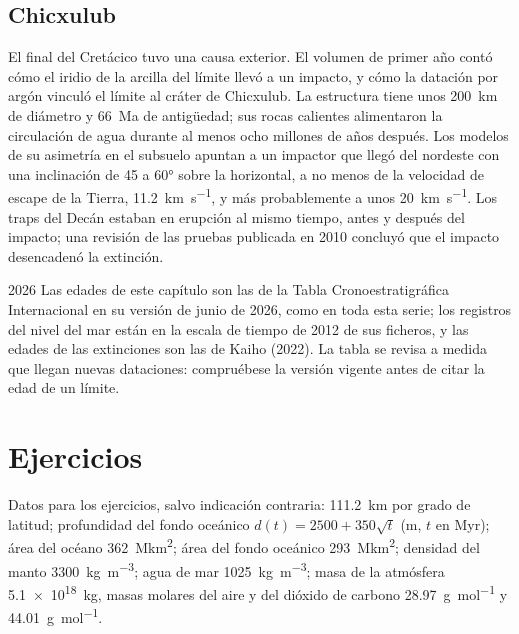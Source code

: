 \subsection*{Chicxulub}

El final del Cretácico tuvo una causa exterior. El volumen de primer año contó cómo el iridio de la
arcilla del límite llevó a un impacto, y cómo la datación por argón vinculó el límite al cráter de Chicxulub.
La estructura tiene unos \qty{200}{km} de diámetro y \qty{66}{Ma} de antigüedad; sus
rocas calientes alimentaron la circulación de agua durante al menos ocho millones de años después. Los modelos de su asimetría
en el subsuelo apuntan a un impactor que llegó del nordeste con una inclinación de 45 a \ang{60} sobre la horizontal,
a no menos de la velocidad de escape de la Tierra, \qty{11.2}{km.s^{-1}}, y más probablemente a unos
\qty{20}{km.s^{-1}}. Los traps del Decán estaban en erupción al mismo tiempo, antes y después del
impacto; una revisión de las pruebas publicada en 2010 concluyó que el impacto desencadenó la extinción.

\begin{dated}{2026}
Las edades de este capítulo son las de la Tabla Cronoestratigráfica Internacional en su versión de junio
de 2026, como en toda esta serie; los registros del nivel del mar están en la escala de tiempo de 2012
de sus ficheros, y las edades de las extinciones son las de Kaiho (2022). La tabla se revisa a medida que llegan
nuevas dataciones: compruébese la versión vigente antes de citar la edad de un límite.
\end{dated}

\section*{Ejercicios}\label{sec:b2:phanerozoic-earth:exercises}

Datos para los ejercicios, salvo indicación contraria: \qty{111.2}{km} por grado de latitud; profundidad
del fondo oceánico $d(t) = 2500 + 350\sqrt t$ (\unit{m}, $t$ en \unit{Myr}); área del océano
\qty{362}{\mega km^2}; área del fondo oceánico \qty{293}{\mega km^2}; densidad del manto
\qty{3300}{kg.m^{-3}}; agua de mar \qty{1025}{kg.m^{-3}}; masa de la atmósfera
\qty{5.1e18}{kg}, masas molares del aire y del dióxido de carbono \qty{28.97}{g.mol^{-1}} y
\qty{44.01}{g.mol^{-1}}.

